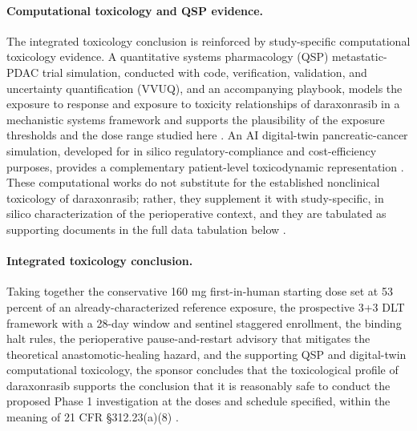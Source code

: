 
\paragraph{Computational toxicology and QSP evidence.}
The integrated toxicology conclusion is reinforced by study-specific computational
toxicology evidence. A quantitative systems pharmacology (QSP) metastatic-PDAC
trial simulation, conducted with code, verification, validation, and uncertainty
quantification (VVUQ), and an accompanying playbook, models the exposure to
response and exposure to toxicity relationships of daraxonrasib in a mechanistic
systems framework and supports the plausibility of the exposure thresholds and
the dose range studied here \cite{qspmetpancre}. An AI digital-twin
pancreatic-cancer simulation, developed for in silico regulatory-compliance and
cost-efficiency purposes, provides a complementary patient-level
toxicodynamic representation \cite{fdadigtwinpc}. These computational works do
not substitute for the established nonclinical toxicology of daraxonrasib;
rather, they supplement it with study-specific, in silico characterization of the
perioperative context, and they are tabulated as supporting documents in the full
data tabulation below \cite{qspmetpancre,fdadigtwinpc}.

\paragraph{Integrated toxicology conclusion.}
Taking together the conservative 160 mg first-in-human starting dose set at 53
percent of an already-characterized reference exposure, the prospective 3+3 DLT
framework with a 28-day window and sentinel staggered enrollment, the binding
halt rules, the perioperative pause-and-restart advisory that mitigates the
theoretical anastomotic-healing hazard, and the supporting QSP and digital-twin
computational toxicology, the sponsor concludes that the toxicological profile of
daraxonrasib supports the conclusion that it is reasonably safe to conduct the
proposed Phase 1 investigation at the doses and schedule specified, within the
meaning of 21 CFR \S 312.23(a)(8) \cite{phase1guidance,cfr312paiuni}.

